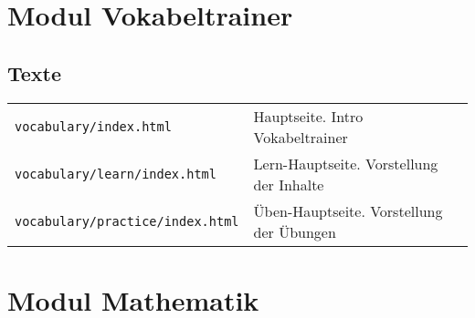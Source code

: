 \section{Modul Vokabeltrainer}
\subsection{Texte}
\begin{tabular}{ | p{} | p{} | } 
	\texttt{vocabulary/index.html}	& Hauptseite. Intro Vokabeltrainer\\
	\texttt{vocabulary/learn/index.html}	& Lern-Hauptseite. Vorstellung der Inhalte\\
	\texttt{vocabulary/practice/index.html}	& Üben-Hauptseite. Vorstellung der Übungen\\
\end{tabular}


\section{Modul Mathematik}

